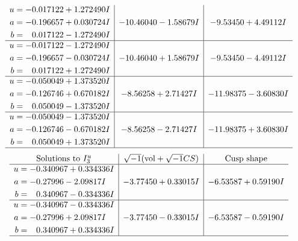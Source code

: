 \documentclass[1p]{elsarticle_modified}
\theoremstyle{definition}
\newcommand{\I}{\sqrt{-1}}
\begin{document}
$$\begin{array}{c|c|c}
\begin{aligned}
u &= -0.017122 + 1.272490 I \\
a &= -0.196657 + 0.030724 I \\
b &= \phantom{-}0.017122 - 1.272490 I\end{aligned}
 & -10.46040 - 1.58679 I & -9.53450 + 4.49112 I \\ \hline\begin{aligned}
u &= -0.017122 - 1.272490 I \\
a &= -0.196657 - 0.030724 I \\
b &= \phantom{-}0.017122 + 1.272490 I\end{aligned}
 & -10.46040 + 1.58679 I & -9.53450 - 4.49112 I \\ \hline\begin{aligned}
u &= -0.050049 + 1.373520 I \\
a &= -0.126746 + 0.670182 I \\
b &= \phantom{-}0.050049 - 1.373520 I\end{aligned}
 & -8.56258 + 2.71427 I & -11.98375 - 3.60830 I \\ \hline\begin{aligned}
u &= -0.050049 - 1.373520 I \\
a &= -0.126746 - 0.670182 I \\
b &= \phantom{-}0.050049 + 1.373520 I\end{aligned}
 & -8.56258 - 2.71427 I & -11.98375 + 3.60830 I\\
 \hline 
 \end{array}$$\newpage$$\begin{array}{c|c|c}  
\text{Solutions to }I^u_{3}& \I (\text{vol} + \sqrt{-1}CS) & \text{Cusp shape}\\
 \hline 
\begin{aligned}
u &= -0.340967 + 0.334336 I \\
a &= -0.27996 - 2.09817 I \\
b &= \phantom{-}0.340967 - 0.334336 I\end{aligned}
 & -3.77450 + 0.33015 I & -6.53587 + 0.59190 I \\ \hline\begin{aligned}
u &= -0.340967 - 0.334336 I \\
a &= -0.27996 + 2.09817 I \\
b &= \phantom{-}0.340967 + 0.334336 I\end{aligned}
 & -3.77450 - 0.33015 I & -6.53587 - 0.59190 I\\
 \hline 
 \end{array}$$\newpage\newpage\renewcommand{\arraystretch}{1}
\end{document}
